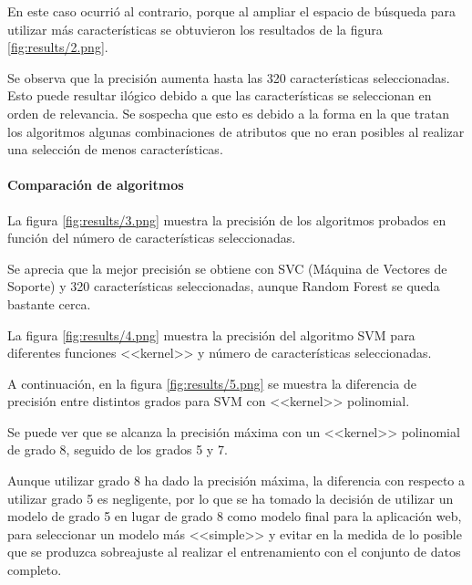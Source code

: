 En este caso ocurrió al contrario, porque al ampliar el espacio de búsqueda para
utilizar más características se obtuvieron los resultados de la figura
\ref{fig:results/2.png}.


Se observa que la precisión aumenta hasta las 320 características seleccionadas.
Esto puede resultar ilógico debido a que las características se seleccionan en
orden de relevancia. Se sospecha que esto es debido a la forma en la que tratan los
algoritmos algunas combinaciones de atributos que no eran posibles al realizar
una selección de menos características.

\paragraph{Comparación de algoritmos}

La figura \ref{fig:results/3.png} muestra la precisión de los algoritmos
probados en función del número de características seleccionadas.


Se aprecia que la mejor precisión se obtiene con SVC (Máquina de Vectores de
Soporte) y 320 características seleccionadas, aunque Random Forest se queda
bastante cerca.

La figura \ref{fig:results/4.png} muestra la precisión del algoritmo SVM para
diferentes funciones <<kernel>> y número de características seleccionadas.


A continuación, en la figura \ref{fig:results/5.png} se muestra la diferencia de
precisión entre distintos grados para SVM con <<kernel>> polinomial.


Se puede ver que se alcanza la precisión máxima con un <<kernel>> polinomial de
grado 8, seguido de los grados 5 y 7. 

Aunque utilizar grado 8 ha dado la precisión máxima, la diferencia con respecto
a utilizar grado 5 es negligente, por lo que se ha tomado la decisión de
utilizar un modelo de grado 5 en lugar de grado 8 como modelo final para la
aplicación web, para seleccionar un modelo más <<simple>> y evitar en la medida
de lo posible que se produzca sobreajuste al realizar el entrenamiento con el
conjunto de datos completo.

